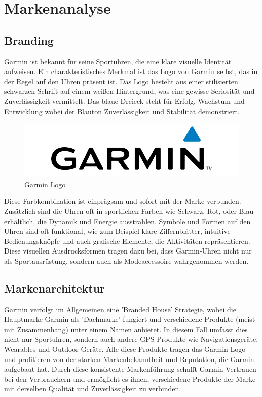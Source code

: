 \section{Markenanalyse} \label{sec:markenanalyse}

\subsection{Branding}
Garmin ist bekannt für seine Sportuhren, die eine klare visuelle Identität aufweisen. Ein charakteristisches Merkmal ist das Logo von Garmin selbst, das in der Regel auf den Uhren präsent ist. Das Logo besteht aus einer stilisierten schwarzen Schrift auf einem weißen Hintergrund, was eine gewisse Seriosität und Zuverlässigkeit vermittelt. Das blaue Dreieck steht für Erfolg, Wachstum und Entwicklung wobei der Blauton Zuverlässigkeit und Stabilität demonstriert. \cite{logo}

\begin{figure}[H]
    \centering
    \includegraphics[width=0.6\linewidth]{Figure/logo.png}
    \caption{Garmin Logo \cite{logo}}
    \label{fig:logo}
\end{figure}

Diese Farbkombination ist einprägsam und sofort mit der Marke verbunden. Zusätzlich sind die Uhren oft in sportlichen Farben wie Schwarz, Rot, oder Blau erhältlich, die Dynamik und Energie ausstrahlen. Symbole und Formen auf den Uhren sind oft funktional, wie zum Beispiel klare Ziffernblätter, intuitive Bedienungsknöpfe und auch grafische Elemente, die Aktivitäten repräsentieren. Diese visuellen Ausdrucksformen tragen dazu bei, dass Garmin-Uhren nicht nur als Sportausrüstung, sondern auch als Modeaccessoire wahrgenommen werden.

\subsection{Markenarchitektur}\label{Markenarchitektur}
Garmin verfolgt im Allgemeinen eine 'Branded House' Strategie, wobei die Hauptmarke Garmin als 'Dachmarke' fungiert und verschiedene Produkte (meist mit Zusammenhang) unter einem Namen anbietet. In diesem Fall umfasst dies nicht nur Sportuhren, sondern auch andere GPS-Produkte wie Navigationsgeräte, Wearables und Outdoor-Geräte. Alle diese Produkte tragen das Garmin-Logo und profitieren von der starken Markenbekanntheit und Reputation, die Garmin aufgebaut hat. Durch diese konsistente Markenführung schafft Garmin Vertrauen bei den Verbrauchern und ermöglicht es ihnen, verschiedene Produkte der Marke mit derselben Qualität und Zuverlässigkeit zu verbinden.
